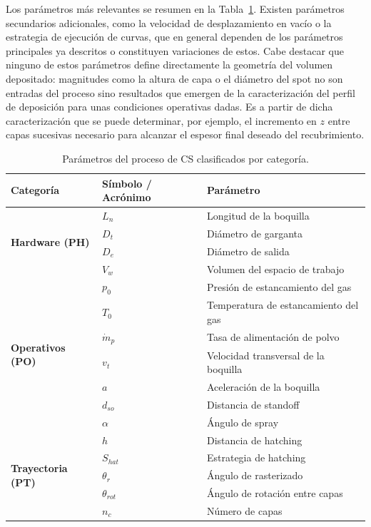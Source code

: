 Los parámetros más relevantes se resumen en la Tabla~\ref{tab:parametros_cs}. Existen parámetros secundarios adicionales, como la velocidad de desplazamiento en vacío o la estrategia de ejecución de curvas, que en general dependen de los parámetros principales ya descritos o constituyen variaciones de estos. Cabe destacar que ninguno de estos parámetros define directamente la geometría del volumen depositado: magnitudes como la altura de capa o el diámetro del spot no son entradas del proceso sino resultados que emergen de la caracterización del perfil de deposición para unas condiciones operativas dadas. Es a partir de dicha caracterización que se puede determinar, por ejemplo, el incremento en
$z$ entre capas sucesivas necesario para alcanzar el espesor final deseado del recubrimiento.


\begin{table}[h]
	\centering
	\caption[Parámetros del proceso de CS clasificados por categoría]{Parámetros del proceso de CS clasificados por categoría.}
	\label{tab:parametros_cs}
	\begin{tabular}{llp{6cm}}
		\hline
		\textbf{Categoría} & \textbf{Símbolo / Acrónimo} & \textbf{Parámetro} \\
		\hline
		\multirow{4}{*}{\textbf{Hardware (PH)}}
		& $L_n$       & Longitud de la boquilla \\
		& $D_t$       & Diámetro de garganta\\
		& $D_e$       & Diámetro de salida  \\
		& $V_w$       & Volumen del espacio de trabajo \\
		\hline
		\multirow{7}{*}{\textbf{Operativos (PO)}}
		& $p_0$       & Presión de estancamiento del gas \\
		& $T_0$       & Temperatura de estancamiento del gas \\
		& $\dot{m}_p$ & Tasa de alimentación de polvo \\
		& $v_t$       & Velocidad transversal de la boquilla \\
		& $a$         & Aceleración de la boquilla \\
		& $d_{so}$    & Distancia de standoff \\
		& $\alpha$    & Ángulo de spray \\
		\hline
		\multirow{5}{*}{\textbf{Trayectoria (PT)}}
		& $h$         & Distancia de hatching  \\
		& $S_{hat}$   & Estrategia de hatching  \\
		& $\theta_r$  & Ángulo de rasterizado \\
		& $\theta_{rot}$ & Ángulo de rotación entre capas \\
		& $n_c$       & Número de capas \\
		\hline
	\end{tabular}
\end{table}


